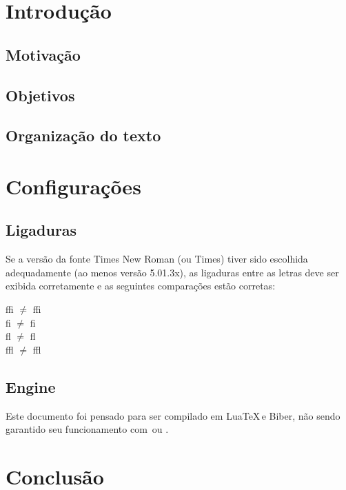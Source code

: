 \documentclass[a4paper, 12pt]{article}
\begin{document}
    \section{Introdução}

    \subsection{Motivação}
    \lipsum[1-2]
    \subsection{Objetivos}
    \lipsum[3-4]
    \subsection{Organização do texto}
    \lipsum[5-6]
    \clearpage
    \section{Configurações}
    \subsection{Ligaduras}
    Se a versão da fonte Times New Roman (ou Times) tiver sido escolhida adequadamente
    (ao menos versão 5.01.3x), as ligaduras entre as letras deve ser exibida
    corretamente e as seguintes comparações estão corretas: \\
    
    \begin{center}
        \Huge
        f\/f\/i \(\neq\) ffi \\
        f\/i \(\neq\) fi \\
        f\/l \(\neq\) fl \\
        f\/f\/l \(\neq\) ffl \\
    \end{center}

    \subsection{Engine}
    Este documento foi pensado para ser compilado em Lua\TeX \,e Biber, não sendo
    garantido seu funcionamento com \LaTeXe \,ou \XeLaTeX.

    \clearpage
    \section{Conclusão}
    \clearpage
\end{document}

